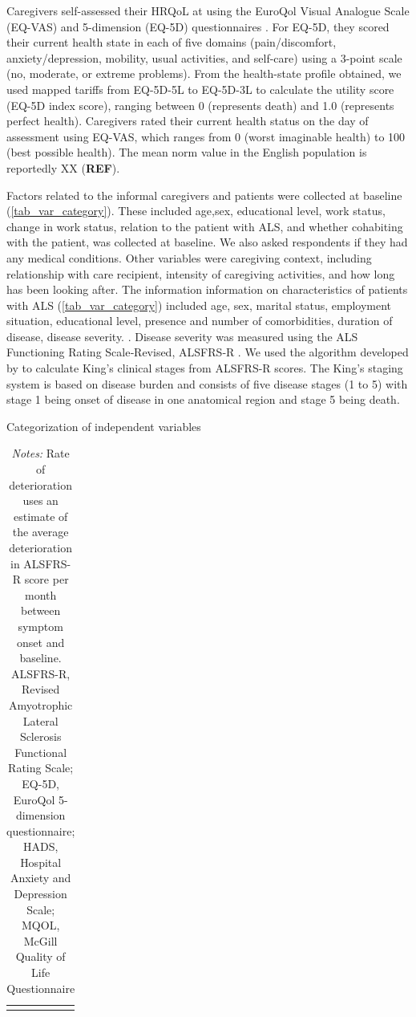 \documentclass[12pt]{article}
\begin{document}
Caregivers self-assessed their HRQoL at using the EuroQol Visual Analogue Scale (EQ-VAS) and 5-dimension (EQ-5D) questionnaires \parencite{herdman_development_2011}. For EQ-5D, they scored their current health state in each of five domains (pain/discomfort, anxiety/depression, mobility, usual activities, and self-care) using a 3-point scale (no, moderate, or extreme problems). From the health-state profile obtained, we used mapped tariffs from EQ-5D-5L to EQ-5D-3L \parencite{hernandez_alava_eq-5d-5l_2018} to calculate the utility score (EQ-5D index score), ranging between 0 (represents death) and 1.0 (represents perfect health). Caregivers rated their current health status on the day of assessment using EQ-VAS, which ranges from 0 (worst imaginable health) to 100 (best possible health). The mean norm value in the English population is reportedly XX (\textbf{REF}). 

Factors related to the informal caregivers and patients were collected at baseline (\autoref{tab_var_category}). These included age,sex, educational level, work status, change in work status, relation to the patient with ALS, and whether cohabiting with the patient, was collected at baseline.  We also asked respondents if they had any medical conditions. Other variables were caregiving context, including relationship with care recipient, intensity of caregiving activities, and how long has been looking after. The information information on characteristics of patients with ALS (\autoref{tab_var_category}) included age, sex, marital status, employment situation, educational level, presence and number of comorbidities, duration of disease, disease severity. . Disease severity was measured using the ALS Functioning Rating Scale‐Revised, ALSFRS‐R \parencite{cedarbaum_alsfrs-r_1999}. We used the algorithm developed by \textcite{balendra_estimating_2014} to calculate King's clinical stages from ALSFRS-R scores. The King's staging system is based on disease burden and consists of five disease stages (1 to 5) with stage 1 being onset of disease in one anatomical region and stage 5 being death.

\begin{table}[H]
    \centering \singlespacing \small
    \caption{Categorization of independent variables}
    \begin{tabular}{|L{6cm}|L{9cm}|}
        \hline
    \end{tabular}
    \label{tab_var_category}
    \caption*{\footnotesize \textit{Notes:} Rate of deterioration uses an estimate of the average deterioration in ALSFRS-R score per month between symptom onset and baseline. ALSFRS-R, Revised Amyotrophic Lateral Sclerosis Functional Rating Scale; EQ-5D, EuroQol 5-dimension questionnaire; HADS, Hospital Anxiety and Depression Scale; MQOL, McGill Quality of Life Questionnaire}
\end{table}
\end{document}
